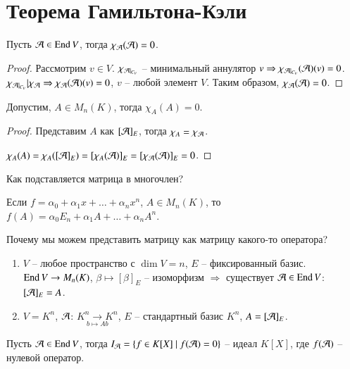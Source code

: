 \documentclass[main]{subfiles}
\begin{document}
\chapter{Теорема Гамильтона-Кэли}

\begin{theorem}
    Пусть $\mathcal{A} \in \operatorname{End} V$, тогда $\chi_{\mathcal{A}}(\mathcal{A}) = 0$.
\end{theorem}

\begin{proof}
    Рассмотрим $v \in V$.  $\chi_{\mathcal{A} |_{C_v}}$ -- минимальный аннулятор $v \Rightarrow \chi_{\mathcal{A} |_{C_v}}(\mathcal{A})(v) = 0$.
    $\chi_{\mathcal{A} |_{C_v}} | \chi_{\mathcal{A}} \Rightarrow \chi_{\mathcal{A}} (\mathcal{A})(v) = 0$,
    $v$ -- любой элемент $V$. Таким образом, $\chi_{\mathcal{A}}(\mathcal{A}) = 0$.
\end{proof}

\begin{corollary} 
    Допустим, $A \in M_n(K)$, тогда $\chi_A(A)=0$.
\end{corollary}

\begin{proof}
    Представим $A$ как $[\mathcal{A}]_E$, тогда $\chi_A = \chi_{\mathcal{A}}$.

    $\chi_A (A) = \chi_A ([\mathcal{A}]_E) = [\chi_A(\mathcal{A})]_E =[\chi_{\mathcal{A}}(\mathcal{A})]_E = 0$.
\end{proof}

Как подставляется матрица в многочлен?

Если $f = \alpha_0 + \alpha_1 x + \ldots + \alpha_n x^n$, $A \in M_n(K)$, то
$f(A) = \alpha_0 E_n + \alpha_1 A + \ldots + \alpha_n A^n$.

Почему мы можем представить матрицу как матрицу какого-то оператора?
\begin{enumerate}
    \item $V$ -- любое пространство с $\dim V = n$, $E$ -- фиксированный базис.
          $\operatorname{End} V \rightarrow M_n(K)$, $\beta \mapsto [\beta]_E$ -- изоморфизм $\Rightarrow$ существует $\mathcal{A} \in \operatorname{End} V$: $[\mathcal{A}]_E = A$.

    \item $V = K^n$, $\mathcal{A}$: $\underset{b \mapsto Ab}{K^n \rightarrow K^n}$, $E$ -- стандартный базис $K^n$, $A = [\mathcal{A}]_E$.
\end{enumerate}

\begin{proposition}
    Пусть $\mathcal{A} \in \operatorname{End} V$, тогда $I_{\mathcal{A}} = \{f\in K[X] \ | \ f(\mathcal{A}) = 0\}$ -- идеал $K[X]$, где $f(\mathcal{A})$ -- нулевой оператор.
\end{proposition}
\end{document}

